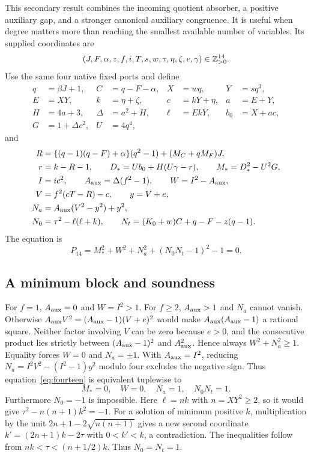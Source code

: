 \documentclass[11pt,a4paper]{article}
\theoremstyle{definition}\newtheorem{definition}[theorem]{Definition}
\theoremstyle{remark}\newtheorem{remark}[theorem]{Remark}
\begin{document}
This secondary result combines the incoming quotient absorber, a positive
auxiliary gap, and a stronger canonical auxiliary congruence. It is useful
when degree matters more than reaching the smallest available number of
variables. Its supplied coordinates are
\[
 (J,F,\alpha,z,f,i,T,s,w,\tau,\eta,\zeta,e,\gamma)\in\mathbb Z_{>0}^{14}.
\]
Use the same four native fixed ports and define
\begin{align*}
 q&=\beta J+1,& C&=q-F-\alpha,&X&=wq,&Y&=sq^3,\\
 E&=XY,&k&=\eta+\zeta,&c&=kY+\eta,&a&=E+Y,\\
 H&=4a+3,&\Delta&=a^2+H,&\ell&=EkY,&b_0&=X+ac,\\
 G&=1+\Delta c^2,&U&=4q^4,
\end{align*}
and
\begin{align*}
 R&=\{(q-1)(q-F)+\alpha\}(q^2-1)+(M_C+qM_F)J,\\
 r&=k-R-1,\qquad D_*=Ub_0+H(U\gamma-r),\qquad M_*=D_*^2-U^2G,\\
 I&=ic^2,\qquad A_{\rm aux}=\Delta(f^2-1),\qquad W=I^2-A_{\rm aux},\\
 V&=f^2(cT-R)-c,\qquad y=V+e,\\
 N_a&=A_{\rm aux}(V^2-y^2)+y^2,\\
 N_0&=\tau^2-\ell(\ell+k),\qquad
 N_t=(K_0+w)C+q-F-z(q-1).
\end{align*}
The equation is
\begin{equation}\boxed{
 P_{14}=M_*^2+W^2+N_a^2+(N_0N_t-1)^2-1=0.
 }\label{eq:fourteen}
\end{equation}

\subsection{A minimum block and soundness}

For $f=1$, $A_{\rm aux}=0$ and $W=I^2>1$. For $f\ge2$,
$A_{\rm aux}>1$ and $N_a$ cannot vanish. Otherwise
$A_{\rm aux}V^2=(A_{\rm aux}-1)(V+e)^2$ would make
$A_{\rm aux}(A_{\rm aux}-1)$ a rational square. Neither factor involving
$V$ can be zero because $e>0$, and the consecutive product lies strictly
between $(A_{\rm aux}-1)^2$ and $A_{\rm aux}^2$. Hence always
$W^2+N_a^2\ge1$. Equality forces $W=0$ and $N_a=\pm1$. With
$A_{\rm aux}=I^2$, reducing
$N_a=I^2V^2-(I^2-1)y^2$ modulo four excludes the negative sign.
Thus equation~\eqref{eq:fourteen} is equivalent tuplewise to
\[
 M_*=0,\quad W=0,\quad N_a=1,\quad N_0N_t=1.
\]
Furthermore $N_0=-1$ is impossible. Here $\ell=nk$ with
$n=XY^2\ge2$, so it would give
$\tau^2-n(n+1)k^2=-1$. For a solution of minimum positive $k$, multiplication
by the unit $2n+1-2\sqrt{n(n+1)}$ gives a new second coordinate
$k'=(2n+1)k-2\tau$ with $0<k'<k$, a contradiction. The inequalities
follow from $nk<\tau<(n+1/2)k$. Thus $N_0=N_t=1$.
\end{document}

